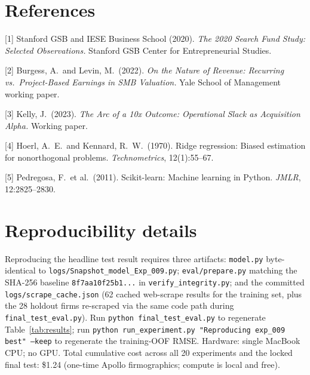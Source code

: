 \documentclass{article}
\begin{document}
\section*{References}
\medskip
{\small
[1] Stanford GSB and IESE Business School (2020). \emph{The 2020 Search Fund Study:
Selected Observations.} Stanford GSB Center for Entrepreneurial Studies.

[2] Burgess, A.\ and Levin, M.\ (2022). \emph{On the Nature of Revenue: Recurring vs.\
Project-Based Earnings in SMB Valuation.} Yale School of Management working paper.

[3] Kelly, J.\ (2023). \emph{The Arc of a 10x Outcome: Operational Slack as Acquisition
Alpha.} Working paper.

[4] Hoerl, A.\ E.\ and Kennard, R.\ W.\ (1970). Ridge regression: Biased estimation for
nonorthogonal problems. \emph{Technometrics}, 12(1):55--67.

[5] Pedregosa, F.\ et al.\ (2011). Scikit-learn: Machine learning in Python.
\emph{JMLR}, 12:2825--2830.
}

\appendix
\section{Reproducibility details}
\label{app:repro}
Reproducing the headline test result requires three artifacts: \texttt{model.py} byte-identical to
\texttt{logs/Snapshot\_model\_Exp\_009.py}; \texttt{eval/prepare.py} matching the SHA-256
baseline \texttt{8f7aa10f25b1...} in \texttt{verify\_integrity.py}; and the committed
\texttt{logs/scrape\_cache.json} (62 cached web-scrape results for the training set,
plus the 28 holdout firms re-scraped via the same code path during \texttt{final\_test\_eval.py}).
Run \texttt{python final\_test\_eval.py} to regenerate Table~\ref{tab:results}; run
\texttt{python run\_experiment.py "Reproducing exp\_009 best" --keep} to regenerate the
training-OOF RMSE. Hardware: single MacBook CPU; no GPU. Total cumulative cost across all
20 experiments and the locked final test: \$1.24 (one-time Apollo firmographics; compute
is local and free).
\end{document}
